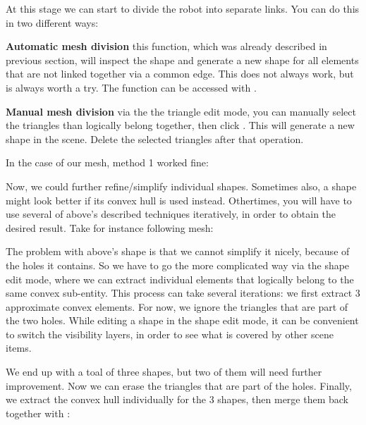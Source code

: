 At this stage we can start to divide the robot into separate 
links. You can do this in two different ways:

\begin{description}
	\item{\textbf{Automatic mesh division}}
	this function, which was already described in previous section, will 
	inspect the shape and generate a new shape for all elements that are not 
	linked together via a common edge. This does not always work, but is 
	always worth a try. The function can be accessed with
	.
	\item{\textbf{Manual mesh division}}
	via the the triangle edit mode, you can manually select the triangles 
	than logically belong together, then click . This will
	generate a new shape in the scene. Delete the selected triangles after 
	that operation.
\end{description}

In the case of our mesh, method 1 worked fine:


Now, we could further refine/simplify individual shapes. Sometimes also, a 
shape might look better if its convex hull is used instead. Othertimes, you 
will have to use several of above's described techniques iteratively, in 
order to obtain the desired result. Take for instance following mesh:


The problem with above's shape is that we cannot simplify it nicely, because 
of the holes it contains. So we have to go the more complicated way via the 
shape edit mode, where we can extract individual elements that logically 
belong to the same convex sub-entity. This process can take several iterations: 
we first extract 3 approximate convex elements. For now, we ignore the 
triangles that are part of the two holes. While editing a shape in the shape 
edit mode, it can be convenient to switch the visibility layers, in order to 
see what is covered by other scene items.


We end up with a toal of three shapes, but two of them will need further 
improvement. Now we can erase the triangles that are part of the holes. 
Finally, we extract the convex hull individually for the 3 shapes, then merge 
them back together with :

